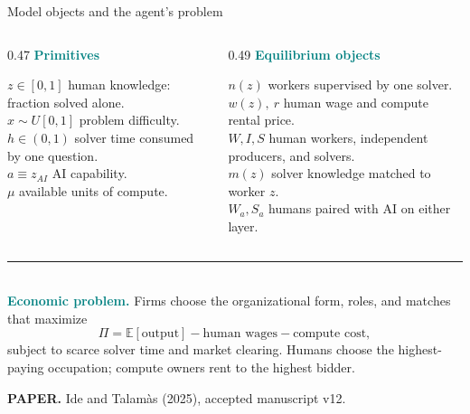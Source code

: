 \documentclass[aspectratio=169,11pt]{beamer}
\newcommand{\key}[1]{\textcolor{Teal}{\textbf{#1}}}
\newcommand{\sourcefoot}{\scriptsize\color{Muted}\textbf{PAPER.} Ide and Talam\`as (2025), accepted manuscript v12.}
\begin{document}
\begin{frame}{Model objects and the agent's problem}
\small
\begin{columns}[T,totalwidth=\textwidth]
\begin{column}{0.47\textwidth}
  \key{Primitives}

  \textbf{$z\in[0,1]$} \; human knowledge: fraction solved alone.\\[0.10cm]
  \textbf{$x\sim U[0,1]$} \; problem difficulty.\\[0.10cm]
  \textbf{$h\in(0,1)$} \; solver time consumed by one question.\\[0.10cm]
  \textbf{$a\equiv z_{AI}$} \; AI capability.\\[0.10cm]
  \textbf{$\mu$} \; available units of compute.
\end{column}
\begin{column}{0.49\textwidth}
  \key{Equilibrium objects}

  \textbf{$n(z)$} \; workers supervised by one solver.\\[0.10cm]
  \textbf{$w(z),\ r$} \; human wage and compute rental price.\\[0.10cm]
  \textbf{$W,I,S$} \; human workers, independent producers, and solvers.\\[0.10cm]
  \textbf{$m(z)$} \; solver knowledge matched to worker $z$.\\[0.10cm]
  \textbf{$W_a,S_a$} \; humans paired with AI on either layer.
\end{column}
\end{columns}

\vfill
{\color{Coral}\rule{\textwidth}{0.8pt}}\\[-0.02cm]
\key{Economic problem.}
Firms choose the organizational form, roles, and matches that maximize
\[
\Pi=\mathbb E[\text{output}]-\text{human wages}-\text{compute cost},
\]
subject to scarce solver time and market clearing. Humans choose the
highest-paying occupation; compute owners rent to the highest bidder.

\vspace{0.06cm}
\sourcefoot
\end{frame}
\end{document}
